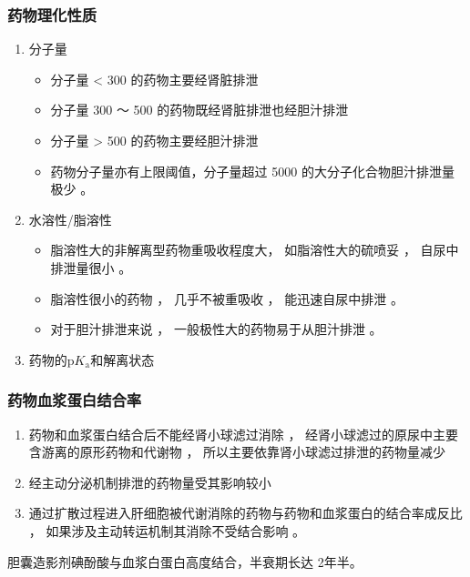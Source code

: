\documentclass[dvipsnames, svgnames, x11names]{beamer}
\begin{document}
\begin{frame}
    \frametitle{药物理化性质}
    \begin{enumerate}
      \item 分子量
        \begin{itemize}
          \item 分子量 < 300 的药物主要经肾脏排泄
          \item 分子量 300 ～ 500 的药物既经肾脏排泄也经胆汁排泄
          \item 分子量 > 500 的药物主要经胆汁排泄
          \item 药物分子量亦有上限阈值，分子量超过 5000 的大分子化合物胆汁排泄量极少 。
        \end{itemize}
      \item 水溶性/脂溶性
        \begin{itemize}
          \item 脂溶性大的非解离型药物重吸收程度大， 如脂溶性大的硫喷妥 ， 自尿中排泄量很小 。
          \item 脂溶性很小的药物 ， 几乎不被重吸收 ， 能迅速自尿中排泄 。
          \item 对于胆汁排泄来说 ， 一般极性大的药物易于从胆汁排泄 。
        \end{itemize}
      \item 药物的$\mathrm{p}K_{\mathrm{a}}$和解离状态
    \end{enumerate}
\end{frame}


\begin{frame}
    \frametitle{药物血浆蛋白结合率}
    \begin{enumerate}
      \item 药物和血浆蛋白结合后不能经肾小球滤过消除 ， 经肾小球滤过的原尿中主要含游离的原形药物和代谢物 ， 所以主要依靠肾小球滤过排泄的药物量减少
      \item 经主动分泌机制排泄的药物量受其影响较小
      \item 通过扩散过程进入肝细胞被代谢消除的药物与药物和血浆蛋白的结合率成反比 ， 如果涉及主动转运机制其消除不受结合影响 。
    \end{enumerate}
    \begin{blankblock}{}
        胆囊造影剂碘酚酸与血浆白蛋白高度结合，半衰期长达 2年半。
    \end{blankblock}
\end{frame}
\end{document}
